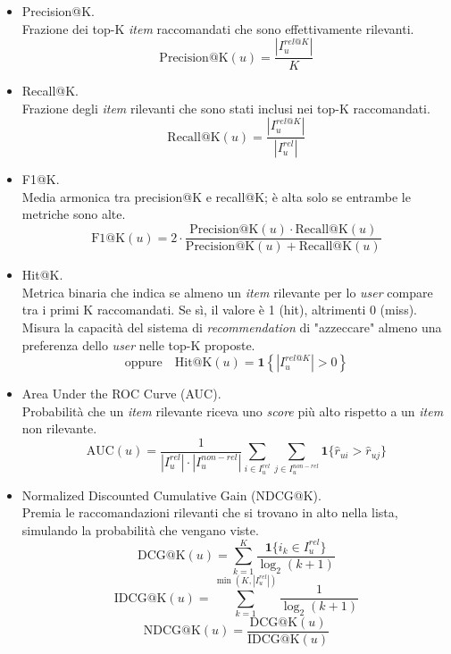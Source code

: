 \begin{itemize}
    \item Precision@K.\\
    Frazione dei top-K \textit{item} raccomandati che sono effettivamente rilevanti.
    \[
    \text{Precision@K}(u) = \frac{|I_u^{rel@K}|}{K}
    \]
    
    \item Recall@K.\\
    Frazione degli \textit{item} rilevanti che sono stati inclusi nei top-K raccomandati.
    \[
    \text{Recall@K}(u) = \frac{|I_u^{rel@K}|}{|I_u^{rel}|}
    \]
    
    \item F1@K.\\
    Media armonica tra precision@K e recall@K; è alta solo se entrambe le metriche sono alte.
    \[
    \text{F1@K}(u) = 2 \cdot \frac{\text{Precision@K}(u) \cdot \text{Recall@K}(u)}{\text{Precision@K}(u) + \text{Recall@K}(u)}
    \]
    \item Hit@K.\\
    Metrica binaria che indica se almeno un \textit{item} rilevante per lo \textit{user} compare tra i primi K raccomandati. Se sì, il valore è 1 (hit), altrimenti 0 (miss). Misura la capacità del sistema di \textit{recommendation} di "azzeccare" almeno una preferenza dello \textit{user} nelle top-K proposte.\\
    \[
    \text{oppure} \quad 
    \text{Hit@K}(u) = \mathbf{1}\left\{ |I_u^{rel@K}| > 0 \right\}
    \]  
    
    \item Area Under the ROC Curve (AUC).\\
    Probabilità che un \textit{item} rilevante riceva uno \textit{score} più alto rispetto a un \textit{item} non rilevante.
    \[
    \text{AUC}(u) = \frac{1}{|I_u^{rel}| \cdot |I_u^{non-rel}|} \sum_{i \in I_u^{rel}} \sum_{j \in I_u^{non-rel}} \mathbf{1}\{\hat{r}_{ui} > \hat{r}_{uj}\}
    \]
    
    \item Normalized Discounted Cumulative Gain (NDCG@K).\\
    Premia le raccomandazioni rilevanti che si trovano in alto nella lista, simulando la probabilità che vengano viste.
    \[
    \text{DCG@K}(u) = \sum_{k=1}^{K} \frac{\mathbf{1}\{i_k \in I_u^{rel}\}}{\log_2(k + 1)}
    \]
    \[
    \text{IDCG@K}(u) = \sum_{k=1}^{\min(K, |I_u^{rel}|)} \frac{1}{\log_2(k + 1)}
    \]
    \[
    \text{NDCG@K}(u) = \frac{\text{DCG@K}(u)}{\text{IDCG@K}(u)}
    \]
\end{itemize}